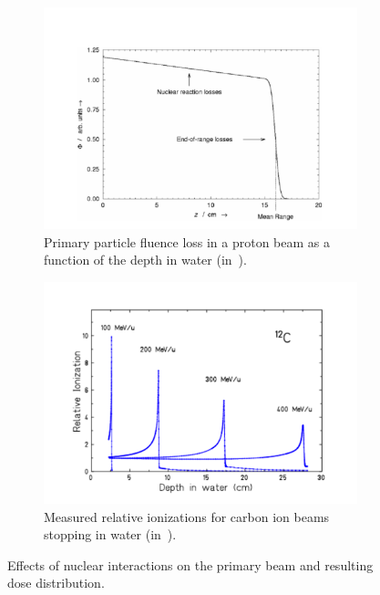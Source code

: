 \begin{figure}
\begin{subfigure}[b]{.5\textwidth}
\centering
\includegraphics[width=1.\textwidth]{03_GraphicFiles/chapter1_Introduction/primaryLoss.pdf}
\caption{Primary particle fluence loss in a proton beam as a function of the depth in water (in~\cite{Newhauser2015}).}
\label{chap1::fig::nuclearReacLoss}
\end{subfigure}
\begin{subfigure}[b]{.5\textwidth}
\centering
\includegraphics[width=1.\textwidth]{03_GraphicFiles/chapter1_Introduction/tailBragg.pdf}	
\caption{Measured relative ionizations for carbon ion beams stopping in water (in~\cite{Schardt2008}).}
\label{chap1::fig::TailBragg}
\end{subfigure}
\caption{Effects of nuclear interactions on the primary beam and resulting dose distribution.}
\label{chap1::fig::}
\end{figure}

